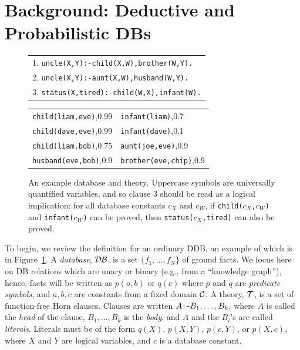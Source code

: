 \documentclass{article}
\newcommand{\cd}[1]{{\small \texttt{#1}}}
\newcommand{\trm}[1]{\textit{#1}}
\newcommand{\C}{{\cal{C}}}
\newcommand{\T}{{\cal{T}}}
\newcommand{\DB}{{\cal{DB}}}
\begin{document}
\section{Background: Deductive and Probabilistic DBs}

\begin{figure}
\begin{small}
\begin{center}
\begin{tabular}[t]{l}
1. \cd{uncle(X,Y):-child(X,W),brother(W,Y).}\\ 2. \cd{uncle(X,Y):-aunt(X,W),husband(W,Y).}\\ 3. \cd{status(X,tired):-child(W,X),infant(W).}\\
\end{tabular}\begin{tabular}[t]{ll}
\cd{child(liam,eve)},0.99   & \cd{infant(liam)},0.7\\
\cd{child(dave,eve)},0.99   & \cd{infant(dave)},0.1\\
\cd{child(liam,bob)},0.75   & \cd{aunt(joe,eve)},0.9\\
\cd{husband(eve,bob)},0.9   & \cd{brother(eve,chip)},0.9\\
\end{tabular}
\end{center}
\end{small}
\caption{\small An example database and theory.  Uppercase symbols are
  universally quantified variables, and so clause 3 should be read as
  a logical implication: for all database constants $c_X$ and $c_W$,
  if \cd{child($c_X$,$c_W$)} and \cd{infant($c_W$)} can be proved,
  then \cd{status($c_X$,tired)} can also be proved.}\label{fig:ddb}
\end{figure}

To begin, we review the definition for an ordinary DDB, an example of
which is in Figure~\ref{fig:ddb}.  A \trm{database}, $\DB$, is a set
$\{f_1,\ldots,f_N\}$ of ground facts.  We focus here on DB relations
which are unary or binary (e.g., from a ``knowledge graph''), hence,
facts will be written as $p(a,b)$ or $q(c)$ where $p$ and $q$ are
\trm{predicate symbols}, and $a,b,c$ are constants from a fixed domain
$\C$.  A theory, $\T$, is a set of function-free Horn clauses. Clauses
are written $A\cd{:-}B_1,\ldots,B_k$, where $A$ is called the
\trm{head} of the clause, $B_1,\ldots,B_k$ is the \trm{body}, and $A$
and the $B_i$'s are called \trm{literals}. Literals must be of the
form $q(X)$, $p(X,Y)$, $p(c,Y)$, or $p(X,c)$, where $X$ and $Y$ are
logical variables, and $c$ is a database constant.
\end{document}
